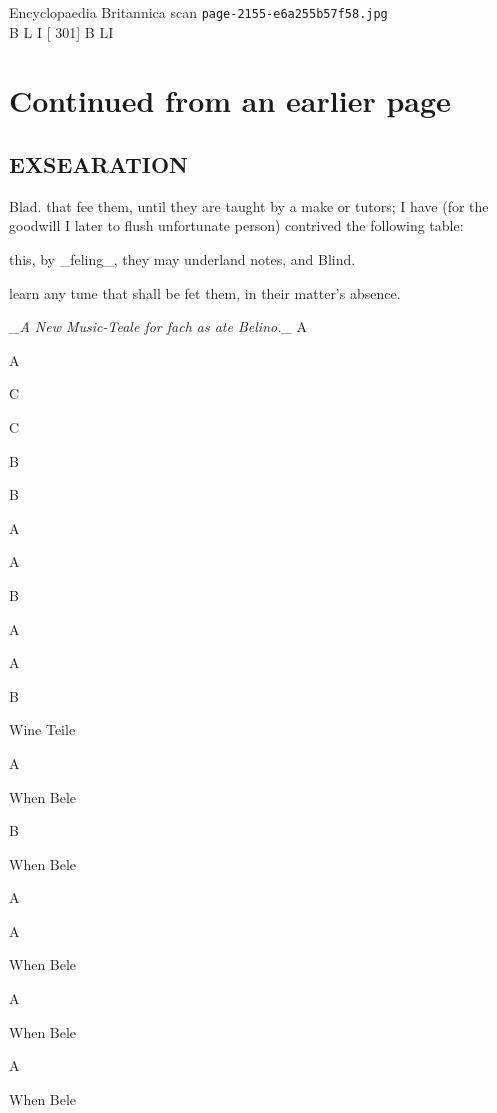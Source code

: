 \documentclass{article}
\begin{document}
\begin{center}
{\Large Encyclopaedia Britannica scan \texttt{page-2155-e6a255b57f58.jpg}}\\[0.5em]
B L I [ 301] B LI
\end{center}
\section*{Continued from an earlier page}
\subsection*{EXSEARATION}
Blad. that fee them, until they are taught by a make or tutors; I have (for the goodwill I later to flush unfortunate person) contrived the following table:

this, by \_feling\_, they may underland notes, and Blind.

learn any tune that shall be fet them, in their matter’s absence.

\textit{\_A New Music-Teale for fach as ate Belino.\_}
A

A

C

C

B

B

A

A

B

A

A

B

Wine Teile

A

When Bele

B

When Bele

A

A

When Bele

A

When Bele

A

When Bele
\end{document}
